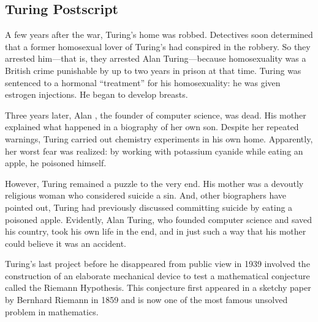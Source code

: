 \subsection{Turing Postscript}

A few years after the war, Turing's home was robbed.  Detectives soon
determined that a former homosexual lover of Turing's had conspired in
the robbery.  So they arrested him---that is, they arrested Alan
Turing---because homosexuality was a British crime punishable by up
to two years in prison at that time.  Turing was sentenced to a
hormonal ``treatment'' for his homosexuality: he was given estrogen
injections.  He began to develop breasts.

Three years later, Alan , the founder of computer science, was
dead.  His mother explained what happened in a biography of her own
son.  Despite her repeated warnings, Turing carried out chemistry
experiments in his own home.  Apparently, her worst fear was realized:
by working with potassium cyanide while eating an apple, he poisoned
himself.

However, Turing remained a puzzle to the very end.  His mother was a
devoutly religious woman who considered suicide a sin.  And, other
biographers have pointed out, Turing had previously discussed
committing suicide by eating a poisoned apple.  Evidently, Alan
Turing, who founded computer science and saved his country, took his
own life in the end, and in just such a way that his mother could
believe it was an accident.

Turing's last project before he disappeared from public view in 1939
involved the construction of an elaborate mechanical device to test a
mathematical conjecture called the Riemann Hypothesis.  This conjecture
first appeared in a sketchy paper by Bernhard Riemann in 1859 and is now
one of the most famous unsolved problem in mathematics.

